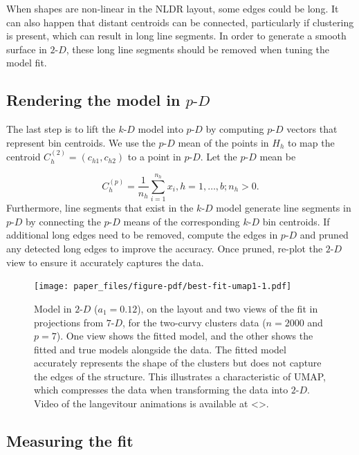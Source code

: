 \documentclass[
  12pt]{article}
\newcommand\pD{$p\text{-}D$}
\newcommand\kD{$k\text{-}D$}
\newcommand\gD{$2\text{-}D$}
\begin{document}
When shapes are non-linear in the NLDR layout, some edges could be long.
It can also happen that distant centroids can be connected, particularly
if clustering is present, which can result in long line segments. In
order to generate a smooth surface in \gD{}, these long line segments
should be removed when tuning the model fit.

\subsection{\texorpdfstring{Rendering the model in
\pD{}}{Rendering the model in }}\label{rendering-the-model-in}

The last step is to lift the \kD{} model into \pD{} by computing \pD{}
vectors that represent bin centroids. We use the \pD{} mean of the
points in \(H_h\) to map the centroid \(C_{h}^{(2)} = (c_{h1}, c_{h2})\)
to a point in \pD{}. Let the \pD{} mean be

\[C_{h}^{(p)} = \frac{1}{n_h}\sum_{i =1}^{n_h} x_i, h = {1, \dots, b; n_h > 0}.\]
Furthermore, line segments that exist in the \kD{} model generate line
segments in \pD{} by connecting the \pD{} means of the corresponding
\kD{} bin centroids. If additional long edges need to be removed,
compute the edges in \pD{} and pruned any detected long edges to improve
the accuracy. Once pruned, re-plot the \gD{} view to ensure it
accurately captures the data.

\begin{figure}[H]

{\centering \texttt{[image: paper\_files/figure-pdf/best-fit-umap1-1.pdf]}

}

\caption{Model in \gD{} (\(a_1 = 0.12\)), on the layout and two views of
the fit in projections from \(7\text{-}D\), for the two-curvy clusters
data (\(n =  2000\) and \(p = 7\)). One view shows the fitted model, and
the other shows the fitted and true models alongside the data. The
fitted model accurately represents the shape of the clusters but does
not capture the edges of the structure. This illustrates a
characteristic of UMAP, which compresses the data when transforming the
data into \gD{}. Video of the langevitour animations is available at
\textless\textgreater.}

\end{figure}%

\subsection{Measuring the fit}\label{sec-summary}
\end{document}
